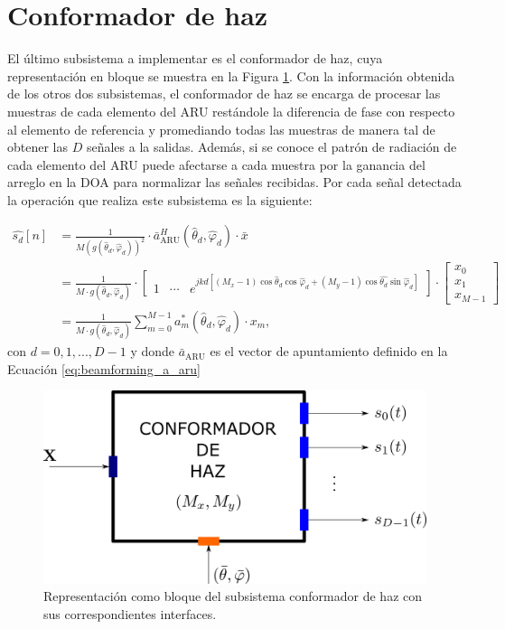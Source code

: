 \section{Conformador de haz}\label{subc:sistema_beamformer}

El último subsistema a implementar es el conformador de haz, cuya representación en bloque se muestra en la Figura \ref{fig:sistema_beamformer}. Con la información obtenida de los otros dos subsistemas, el conformador de haz se encarga de procesar las muestras de cada elemento del ARU restándole la diferencia de fase con respecto al elemento de referencia y promediando todas las muestras de manera tal de obtener las $D$ señales a la salidas. Además, si se conoce el patrón de radiación de cada elemento del ARU puede afectarse a cada muestra por la ganancia del arreglo en la DOA para normalizar las señales recibidas. Por cada señal detectada la operación que realiza este subsistema es la siguiente:

\begin{align}
    \hat{s_d}[n] & =\frac{1}{M\left(g(\hat{\theta}_d,\hat{\varphi}_d)\right)^2}\cdot\bar{a}_{\textrm{ARU}}^H(\hat{\theta}_d,\hat{\varphi}_d) \cdot \bar{x} \\
                 & =\frac{1}{M\cdot g(\hat{\theta}_d,\hat{\varphi}_d)} \cdot \begin{bmatrix}
        1 & \cdots & e^{jkd[(M_x-1)\cos \hat{\theta}_d \cos \hat{\varphi}_d+(M_y-1)\cos \hat{\theta_d} \sin \hat{\varphi}_d]}
    \end{bmatrix} \cdot \begin{bmatrix}
        x_0 \\
        x_1 \\
        x_{M-1}
    \end{bmatrix}    \nonumber      \\
                 & = \frac{1}{M\cdot g(\hat{\theta}_d,\hat{\varphi}_d)} \sum_{m=0}^{M-1} a_m^*(\hat{\theta}_d,\hat{\varphi}_d) \cdot x_m,\nonumber
\end{align}
con $d=0,1,...,D-1$ y donde $\bar{a}_{\textrm{ARU}}$ es el vector de apuntamiento definido en la Ecuación \ref{eq:beamforming_a_aru}

\begin{figure}[ht!]
    \centering
    \includegraphics[width=0.5\linewidth]{images/06-Sistema/sistema_beamformer.png}
    \caption{Representación como bloque del subsistema conformador de haz con sus correspondientes interfaces.}
    \label{fig:sistema_beamformer}
\end{figure}

